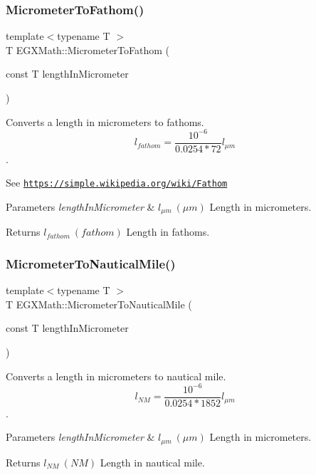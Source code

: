 \subsubsection{\texorpdfstring{Micrometer\+To\+Fathom()}{MicrometerToFathom()}}
{\footnotesize\ttfamily template$<$typename T $>$ \\
T E\+G\+X\+Math\+::\+Micrometer\+To\+Fathom (\begin{DoxyParamCaption}\item[{const T}]{length\+In\+Micrometer }\end{DoxyParamCaption})}



Converts a length in micrometers to fathoms. \[ l_{fathom}= \frac{10^{-6}}{0.0254 * 72} l_{\mu m} \]. 

See \href{https://simple.wikipedia.org/wiki/Fathom}{\tt https\+://simple.\+wikipedia.\+org/wiki/\+Fathom} 
\begin{DoxyParams}{Parameters}
{\em length\+In\+Micrometer} & $ l_{\mu m}\ (\mu m)$ Length in micrometers. \\
\hline
\end{DoxyParams}
\begin{DoxyReturn}{Returns}
$ l_{fathom}\ (fathom)$ Length in fathoms. 
\end{DoxyReturn}
\mbox{\label{group___e_g_x_math-_conversions-_length_conversions-_micrometer-_nautical_ga43c5eb76a19baf316e06b38781369157}} 
\subsubsection{\texorpdfstring{Micrometer\+To\+Nautical\+Mile()}{MicrometerToNauticalMile()}}
{\footnotesize\ttfamily template$<$typename T $>$ \\
T E\+G\+X\+Math\+::\+Micrometer\+To\+Nautical\+Mile (\begin{DoxyParamCaption}\item[{const T}]{length\+In\+Micrometer }\end{DoxyParamCaption})}



Converts a length in micrometers to nautical mile. \[ l_{NM}= \frac{10^{-6}}{0.0254 * 1852} l_{\mu m} \]. 


\begin{DoxyParams}{Parameters}
{\em length\+In\+Micrometer} & $ l_{\mu m}\ (\mu m)$ Length in micrometers. \\
\hline
\end{DoxyParams}
\begin{DoxyReturn}{Returns}
$ l_{NM}\ (NM)$ Length in nautical mile. 
\end{DoxyReturn}
